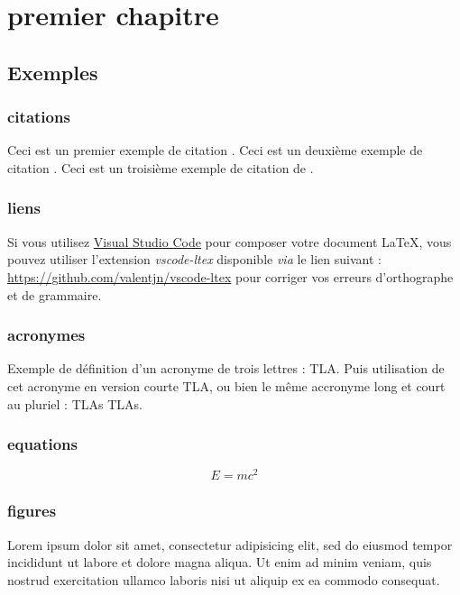 \chapter{premier chapitre}

\section{Exemples}

\subsection{citations}

Ceci est un premier exemple de citation \cite{RN3}. Ceci est un deuxième exemple de citation \citep{RN4}. Ceci est un troisième exemple de citation de \citet{RN5}.

\subsection{liens}

Si vous utilisez \href{https://code.visualstudio.com/}{Visual Studio Code} pour composer votre document \LaTeX{}, vous pouvez utiliser l'extension \textit{vscode-ltex} disponible \textit{via} le lien suivant : \url{https://github.com/valentjn/vscode-ltex} pour corriger vos erreurs d'orthographe et de grammaire.

\subsection{acronymes}

Exemple de définition d'un acronyme de trois lettres : \ac{TLA}. Puis utilisation de cet acronyme en version courte \acs{TLA}, ou bien le même accronyme long et court au pluriel : \aclp{TLA} \acsp{TLA}.

\subsection{equations}

\begin{equation}
E=mc^2
\end{equation}

\subsection{figures}

Lorem ipsum dolor sit amet, consectetur adipisicing elit, sed do eiusmod
tempor incididunt ut labore et dolore magna aliqua. Ut enim ad minim veniam,
quis nostrud exercitation ullamco laboris nisi ut aliquip ex ea commodo
consequat.

